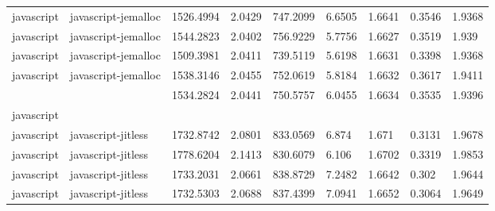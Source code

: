 \begin{longtable}[h]{|lllllllll|}
javascript     & javascript-jemalloc    & 1526.4994                 & 2.0429                                                               & 747.2099              & 6.6505           & 1.6641           & 0.3546       & 1.9368        \\
javascript     & javascript-jemalloc    & 1544.2823                 & 2.0402                                                               & 756.9229              & 5.7756           & 1.6627           & 0.3519       & 1.939         \\
javascript     & javascript-jemalloc    & 1509.3981                 & 2.0411                                                               & 739.5119              & 5.6198           & 1.6631           & 0.3398       & 1.9368        \\
javascript     & javascript-jemalloc    & 1538.3146                 & 2.0455                                                               & 752.0619              & 5.8184           & 1.6632           & 0.3617       & 1.9411        \\
               &                        & 1534.2824                 & 2.0441                                                               & 750.5757              & 6.0455           & 1.6634           & 0.3535       & 1.9396        \\
javascript     &                        &                           &                                                                      &                       &                  &                  &              &               \\
javascript     & javascript-jitless     & 1732.8742                 & 2.0801                                                               & 833.0569              & 6.874            & 1.671            & 0.3131       & 1.9678        \\
javascript     & javascript-jitless     & 1778.6204                 & 2.1413                                                               & 830.6079              & 6.106            & 1.6702           & 0.3319       & 1.9853        \\
javascript     & javascript-jitless     & 1733.2031                 & 2.0661                                                               & 838.8729              & 7.2482           & 1.6642           & 0.302        & 1.9644        \\
javascript     & javascript-jitless     & 1732.5303                 & 2.0688                                                               & 837.4399              & 7.0941           & 1.6652           & 0.3064       & 1.9649        \\

\end{longtable}
